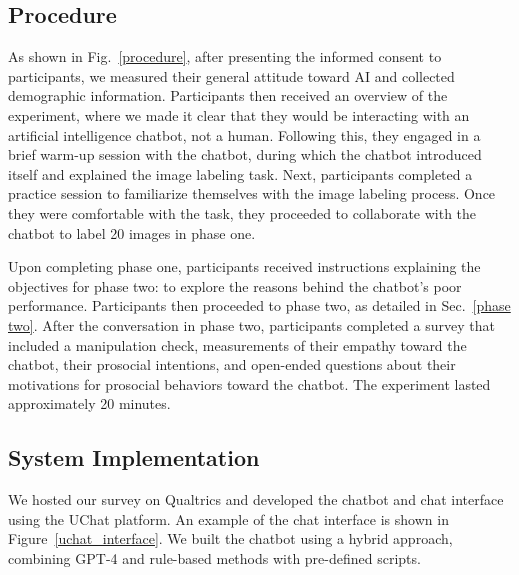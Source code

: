 \subsection{Procedure}
\label{method/procedure}

As shown in Fig.~\ref{procedure}, after presenting the informed consent to participants, we measured their general attitude toward AI \cite{SCHEPMAN2020100014} and collected demographic information. Participants then received an overview of the experiment, where we made it clear that they would be interacting with an artificial intelligence chatbot, not a human. Following this, they engaged in a brief warm-up session with the chatbot, during which the chatbot introduced itself and explained the image labeling task. Next, participants completed a practice session to familiarize themselves with the image labeling process. Once they were comfortable with the task, they proceeded to collaborate with the chatbot to label 20 images in phase one.

Upon completing phase one, participants received instructions explaining the objectives for phase two: to explore the reasons behind the chatbot’s poor performance. Participants then proceeded to phase two, as detailed in Sec.~\ref{phase two}. After the conversation in phase two, participants completed a survey that included a manipulation check, measurements of their empathy toward the chatbot, their prosocial intentions, and open-ended questions about their motivations for prosocial behaviors toward the chatbot. The experiment lasted approximately 20 minutes.


\subsection{System Implementation}

We hosted our survey on Qualtrics and developed the chatbot and chat interface using the UChat platform. An example of the chat interface is shown in Figure~\ref{uchat_interface}. We built the chatbot using a hybrid approach, combining GPT-4 and rule-based methods with pre-defined scripts.

